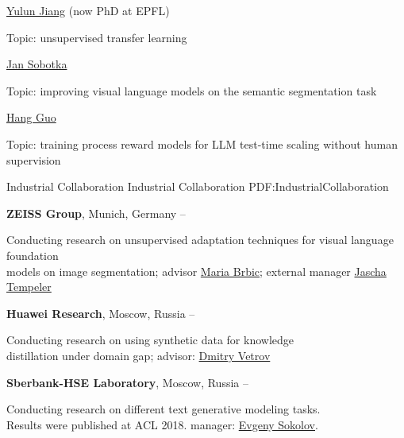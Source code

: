 \documentclass[letterpaper,MMMyyyy,nonstopmode]{simpleresumecv}
\begin{document}
\begin{Body}
\Entry
\href{https://yljblues.github.io}{Yulun Jiang} (now PhD at EPFL)
\begin{Detail}
Topic: unsupervised transfer learning
\end{Detail}
\Gap

\Entry
\href{https://johnny1188.github.io}{Jan Sobotka}
\begin{Detail}
Topic: improving visual language models on the semantic segmentation task
\end{Detail}

\Entry
\href{https://csguoh.github.io}{Hang Guo}
\begin{Detail}
Topic: training process reward models for LLM test-time scaling without human supervision
\end{Detail}


\Section
{Industrial Collaboration}
{Industrial Collaboration}
{PDF:IndustrialCollaboration}

\Entry
\textbf{ZEISS Group}, Munich, Germany
\hfill
{} --
\begin{Detail}
Conducting research on unsupervised adaptation techniques for visual language foundation \\
models on image segmentation; advisor  \href{https://brbiclab.epfl.ch/team/}{Maria Brbic}; external manager \href{https://www.linkedin.com/in/jascha-tempeler-b7b992191/}{Jascha Tempeler}
\end{Detail}
\Gap

\Entry
\textbf{Huawei Research}, Moscow, Russia
\hfill
{} --
\begin{Detail}
Conducting research on using synthetic data for knowledge \\
distillation under domain gap; advisor: \href{https://bayesgroup.ru/people/dmitry-vetrov/}{Dmitry Vetrov}
\end{Detail}
\Gap

\Entry
\textbf{Sberbank-HSE Laboratory}, Moscow, Russia
\hfill
{} --
\begin{Detail}
Conducting research on different text generative modeling tasks.\\
Results were published at ACL 2018. manager: \href{https://www.hse.ru/en/staff/esokolov}{Evgeny Sokolov}.
\end{Detail}


\end{Body}
\end{document}
